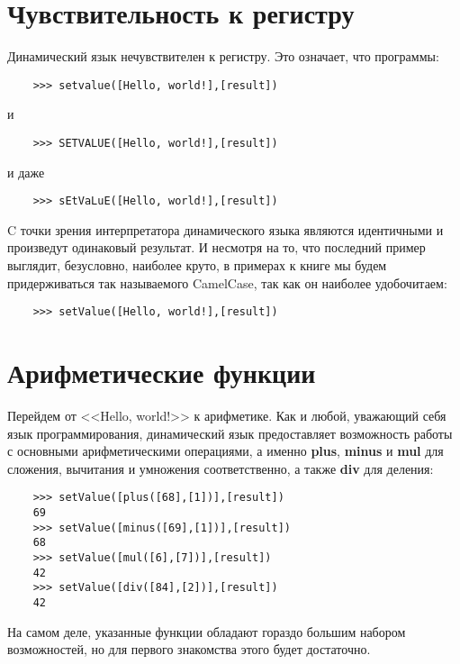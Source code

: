 \documentclass[../index.tex]{subfiles}
\begin{document}
	\section{Чувствительность к регистру}
	
	Динамический язык нечувствителен к регистру. Это означает, что программы:
	
	\begin{verbatim}
	>>> setvalue([Hello, world!],[result])
	\end{verbatim}
	
	и
	
	\begin{verbatim}
	>>> SETVALUE([Hello, world!],[result])
	\end{verbatim}
	
	и даже
	
	\begin{verbatim}
	>>> sEtVaLuE([Hello, world!],[result])
	\end{verbatim}
	
	C точки зрения интерпретатора динамического языка являются идентичными и произведут одинаковый результат. И несмотря на то, что последний пример выглядит, безусловно, наиболее круто, в примерах к книге мы будем придерживаться так называемого CamelCase, так как он наиболее удобочитаем:
	
	\begin{verbatim}
	>>> setValue([Hello, world!],[result])
	\end{verbatim}
	
	\section{Арифметические функции}
	
	Перейдем от <<Hello, world!>> к арифметике. Как и любой, уважающий себя язык программирования, динамический язык предоставляет возможность работы с основными арифметическими операциями, а именно {\bf plus}, {\bf minus} и {\bf mul} для сложения, вычитания и умножения соответственно, а также {\bf div} для деления:
	
	\begin{verbatim}
	>>> setValue([plus([68],[1])],[result])
	69
	>>> setValue([minus([69],[1])],[result])
	68
	>>> setValue([mul([6],[7])],[result])
	42
	>>> setValue([div([84],[2])],[result])
	42
	\end{verbatim}
	
	На самом деле, указанные функции обладают гораздо большим набором возможностей, но для первого знакомства этого будет достаточно. 
				
\end{document}
